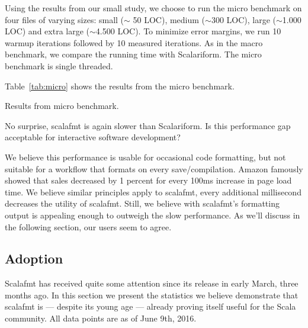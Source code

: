 Using the results from our small study, we choose to run the micro benchmark on four files of varying sizes: small ($\sim$ 50 LOC), medium ($\sim$300 LOC), large ($\sim$1.000 LOC) and extra large ($\sim$4.500 LOC).
To minimize error margins, we run 10 warmup iterations followed by 10 measured iterations.
As in the macro benchmark, we compare the running time with Scalariform.
The micro benchmark is single threaded.

Table~\ref{tab:micro} shows the results from the micro benchmark.
\begin{table}
  \centering
  \caption{Results from micro benchmark.}\label{tab:micro}
  
\end{table}
No surprise, scalafmt is again slower than Scalariform.
Is this performance gap acceptable for interactive software development?

We believe this performance is usable for occasional code formatting, but not suitable for a workflow that formats on every save/compilation.
Amazon famously showed that sales decreased by 1 percent for every 100ms increase in page load time\autocite{kohavi2007online}.
We believe similar principles apply to scalafmt, every additional millisecond decreases the utility of scalafmt.
Still, we believe with scalafmt's formatting output is appealing enough to outweigh the slow performance.
As we'll discuss in the following section, our users seem to agree.

\subsection{Adoption}\label{sec:adoption}
Scalafmt has received quite some attention since its release in early March, three months ago.
In this section we present the statistics we believe demonstrate that scalafmt is --- despite its young age --- already proving itself useful for the Scala community.
All data points are as of June 9th, 2016.


